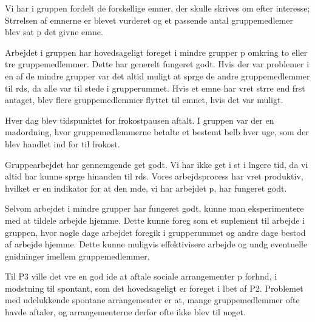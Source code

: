 Vi har i gruppen fordelt de forskellige emner, der skulle skrives om efter interesse; Strrelsen af emnerne er blevet vurderet og et passende antal gruppemedlemer blev sat p det givne emne.

Arbejdet i gruppen har hovedsageligt foreget i mindre grupper p omkring to eller tre gruppemedlemmer. Dette har generelt fungeret godt. 
Hvis der var problemer i en af de mindre grupper var det altid muligt at sprge de andre gruppemedlemmer til rds, da alle var til stede i grupperummet.
Hvis et emne har vret strre end frst antaget, blev flere gruppemedlemmer flyttet til emnet, hvis det var muligt.

Hver dag blev tidspunktet for frokostpausen aftalt. I gruppen var der en madordning, hvor gruppemedlemmerne betalte et bestemt belb hver uge, som der blev handlet ind for til frokost. 

Gruppearbejdet har gennemgende get godt. Vi har ikke get i st i lngere tid, da vi altid har kunne sprge hinanden til rds. Vores arbejdsprocess har vret produktiv, hvilket er en indikator for at den mde, vi har arbejdet p, har fungeret godt.

Selvom arbejdet i mindre grupper har fungeret godt, kunne man eksperimentere med at tildele arbejde hjemme. Dette kunne foreg som et suplement til arbejde i gruppen, hvor nogle dage arbejdet foregik i grupperummet og andre dage bestod af arbejde hjemme.
Dette kunne muligvis effektivisere arbejde og undg eventuelle gnidninger imellem gruppemedlemmer.

Til P3 ville det vre en god ide at aftale sociale arrangementer p forhnd, i modstning til spontant, som det hovedsageligt er foreget i lbet af P2. 
Problemet med udelukkende spontane arrangementer er at, mange gruppemedlemmer ofte havde aftaler, og arrangementerne derfor ofte ikke blev til noget.